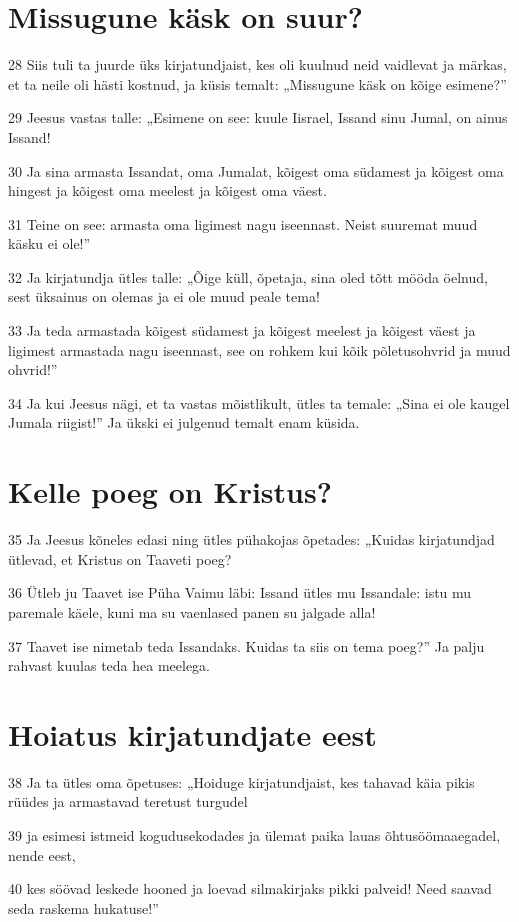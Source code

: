\section*{Missugune käsk on suur?}

\par 28 Siis tuli ta juurde üks kirjatundjaist, kes oli kuulnud neid vaidlevat ja märkas, et ta neile oli hästi kostnud, ja küsis temalt: „Missugune käsk on kõige esimene?”
\par 29 Jeesus vastas talle: „Esimene on see: kuule Iisrael, Issand sinu Jumal, on ainus Issand!
\par 30 Ja sina armasta Issandat, oma Jumalat, kõigest oma südamest ja kõigest oma hingest ja kõigest oma meelest ja kõigest oma väest.
\par 31 Teine on see: armasta oma ligimest nagu iseennast. Neist suuremat muud käsku ei ole!”
\par 32 Ja kirjatundja ütles talle: „Õige küll, õpetaja, sina oled tõtt mööda öelnud, sest üksainus on olemas ja ei ole muud peale tema!
\par 33 Ja teda armastada kõigest südamest ja kõigest meelest ja kõigest väest ja ligimest armastada nagu iseennast, see on rohkem kui kõik põletusohvrid ja muud ohvrid!”
\par 34 Ja kui Jeesus nägi, et ta vastas mõistlikult, ütles ta temale: „Sina ei ole kaugel Jumala riigist!” Ja ükski ei julgenud temalt enam küsida.

\section*{Kelle poeg on Kristus?}

\par 35 Ja Jeesus kõneles edasi ning ütles pühakojas õpetades: „Kuidas kirjatundjad ütlevad, et Kristus on Taaveti poeg?
\par 36 Ütleb ju Taavet ise Püha Vaimu läbi: Issand ütles mu Issandale: istu mu paremale käele, kuni ma su vaenlased panen su jalgade alla!
\par 37 Taavet ise nimetab teda Issandaks. Kuidas ta siis on tema poeg?” Ja palju rahvast kuulas teda hea meelega.

\section*{Hoiatus kirjatundjate eest}

\par 38 Ja ta ütles oma õpetuses: „Hoiduge kirjatundjaist, kes tahavad käia pikis rüüdes ja armastavad teretust turgudel
\par 39 ja esimesi istmeid kogudusekodades ja ülemat paika lauas õhtusöömaaegadel, nende eest,
\par 40 kes söövad leskede hooned ja loevad silmakirjaks pikki palveid! Need saavad seda raskema hukatuse!”


